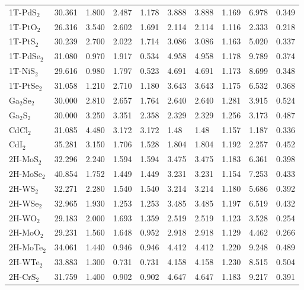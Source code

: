 \begin{center}
\begin{tabularx}{1.1\linewidth}{lXXXXXXXXX}
    1T-PdS$_{2}$ & 30.361  & 1.800  & 2.487  & 1.178  & 3.888  & 3.888  & 1.169  & 6.978  & 0.349 \\
    1T-PtO$_{2}$ & 26.316  & 3.540  & 2.602  & 1.691  & 2.114  & 2.114  & 1.116  & 2.333  & 0.218 \\
    1T-PtS$_{2}$ & 30.239  & 2.700  & 2.022  & 1.714  & 3.086  & 3.086  & 1.163  & 5.020  & 0.337 \\
    1T-PdSe$_{2}$ & 31.080  & 0.970  & 1.917  & 0.534  & 4.958  & 4.958  & 1.178  & 9.789  & 0.374 \\
    1T-NiS$_{2}$ & 29.616  & 0.980  & 1.797  & 0.523  & 4.691  & 4.691  & 1.173  & 8.699  & 0.348 \\
    1T-PtSe$_{2}$ & 31.058  & 1.210  & 2.710  & 1.180  & 3.643  & 3.643  & 1.175  & 6.532  & 0.368 \\
    Ga$_{2}$Se$_{2}$ & 30.000  & 2.810  & 2.657  & 1.764  & 2.640  & 2.640  & 1.281  & 3.915  & 0.524 \\
    Ga$_{2}$S$_{2}$ & 30.000  & 3.250  & 3.351  & 2.358  & 2.329  & 2.329  & 1.256  & 3.173  & 0.487 \\
    CdCl$_{2}$ & 31.085 & 4.480 & 3.172 & 3.172 & 1.48 & 1.48 & 1.157 & 1.187 & 0.336 \\
    CdI$_{2}$ & 35.281  & 3.150  & 1.706  & 1.528  & 1.804  & 1.804  & 1.192  & 2.257  & 0.452 \\
    2H-MoS$_{2}$ & 32.296  & 2.240  & 1.594  & 1.594  & 3.475  & 3.475  & 1.183  & 6.361  & 0.398 \\
    2H-MoSe$_{2}$ & 40.854 & 1.752 & 1.449 &   1.449 & 3.231 &  3.231 & 1.154 & 7.253 & 0.433 \\
    2H-WS$_{2}$ & 32.271  & 2.280  & 1.540  & 1.540  & 3.214  & 3.214  & 1.180  & 5.686  & 0.392 \\
    2H-WSe$_{2}$ & 32.965  & 1.930  & 1.253  & 1.253  & 3.485  & 3.485  & 1.197  & 6.519  & 0.432 \\
    2H-WO$_{2}$ & 29.183  & 2.000  & 1.693  & 1.359  & 2.519  & 2.519  & 1.123  & 3.528  & 0.254 \\
    2H-MoO$_{2}$ & 29.231  & 1.560  & 1.648  & 0.952  & 2.918  & 2.918  & 1.129  & 4.462  & 0.266 \\
    2H-MoTe$_{2}$ & 34.061  & 1.440  & 0.946  & 0.946  & 4.412  & 4.412  & 1.220  & 9.248  & 0.489 \\
    2H-WTe$_{2}$ & 33.883  & 1.300  & 0.731  & 0.731  & 4.158  & 4.158  & 1.230  & 8.515  & 0.504 \\
    2H-CrS$_{2}$ & 31.759  & 1.400  & 0.902  & 0.902  & 4.647  & 4.647  & 1.183  & 9.217  & 0.391 \\

\end{tabularx}
\end{center}
